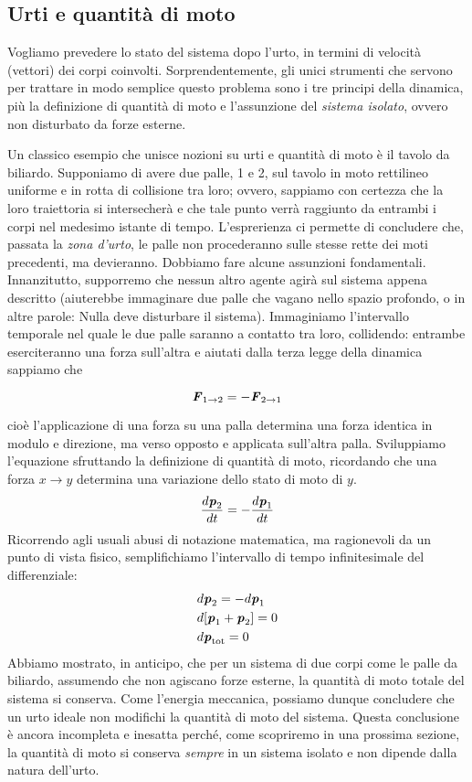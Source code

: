 \subsection*{Urti e quantità di moto}
Vogliamo prevedere lo stato del sistema dopo l'urto, in termini di
velocità (vettori) dei corpi coinvolti. Sorprendentemente, gli unici
strumenti che servono per trattare in modo semplice questo problema
sono i tre principi della dinamica, più la definizione di quantità
di moto e l'assunzione del \textit{sistema isolato}, ovvero non
disturbato da forze esterne.

Un classico esempio che unisce nozioni su urti e quantità di moto è il
tavolo da biliardo. Supponiamo di avere due palle, 1 e 2, sul tavolo in moto
rettilineo
uniforme e in rotta di collisione tra loro; ovvero, sappiamo con certezza
che la loro traiettoria si intersecherà e che tale punto verrà raggiunto
da entrambi i corpi nel medesimo istante di tempo. L'esprerienza ci permette
di concludere che, passata la \textit{zona d'urto}, le palle non procederanno
sulle stesse rette dei moti precedenti, ma devieranno.
Dobbiamo fare alcune assunzioni fondamentali. Innanzitutto, supporremo che
nessun altro agente agirà sul sistema appena descritto (aiuterebbe immaginare
due palle che vagano nello spazio profondo, o in altre parole: Nulla deve
disturbare il sistema).
Immaginiamo l'intervallo temporale nel quale le due palle saranno a contatto
tra loro, collidendo: entrambe eserciteranno una forza sull'altra e aiutati
dalla terza legge della dinamica sappiamo che

\[ \textbf{\textit{F}}_{1 \to 2} = -\textbf{\textit{F}}_{2 \to 1} \]

\noindent cioè l'applicazione di una forza su una palla determina una forza identica
in modulo e direzione, ma verso opposto e applicata sull'altra palla.
Sviluppiamo l'equazione sfruttando la definizione di quantità di moto,
ricordando che una forza $x \to y$ determina una variazione dello stato di
moto di $y$.
\[ \frac{d\textbf{\textit{p}}_2}{dt} = -\frac{d\textbf{\textit{p}}_1}{dt} \]
Ricorrendo agli usuali abusi di notazione matematica, ma ragionevoli da
un punto di vista fisico, semplifichiamo l'intervallo di tempo infinitesimale
del differenziale:
\begin{align*}
    &d\textbf{\textit{p}}_2 = -d\textbf{\textit{p}}_1\\
    &d[\textbf{\textit{p}}_1 + \textbf{\textit{p}}_2] = 0\\
    &d\textbf{\textit{p}}_\text{tot} = 0
\end{align*}
Abbiamo mostrato, in anticipo, che per un sistema di due corpi come le palle
da biliardo, assumendo che non agiscano forze esterne, la quantità di moto
totale del sistema si conserva. Come l'energia meccanica, possiamo dunque
concludere che un urto ideale non modifichi la quantità di moto del sistema.
Questa conclusione è ancora incompleta e inesatta perché, come scopriremo
in una prossima sezione, la quantità di moto si conserva \textit{sempre} in
un sistema isolato e non dipende dalla natura dell'urto.


